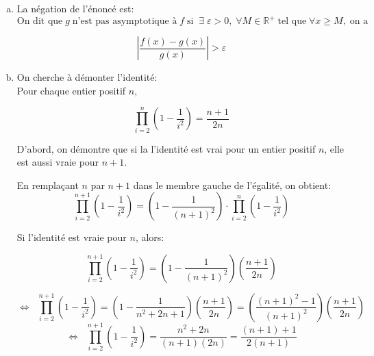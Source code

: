 \documentclass[letterpaper,12pt,oneside,final]{book}
\begin{document}
\begin{enumerate}[a)]

\item %
La négation de l'énoncé est:\\
\begin{equation*}
    \text{On dit que} \; g\; \text{n'est pas asymptotique à}\; f \; \text{si} \;
    \; \exists
    \; \varepsilon > 0, \;\forall M \in \mathbb{R}^{+} \; \text{tel que} \; \forall x \geq M, \;
    \text{on a}
\end{equation*}

\begin{equation*}
    \left \vert \frac{f(x)-g(x)}{g(x)} \right \vert > \varepsilon
\end{equation*}

\item %
On cherche à démonter l'identité:\\
Pour chaque entier positif $n$,

\begin{equation*}
\prod _{i=2}^{n} \left ( 1 - \frac{1}{i^2} \right ) = \frac{n+1}{2n}    
\end{equation*}

D'abord, on démontre que si la l'identité est vrai pour un entier positif $n$, elle est aussi vraie pour $n+1$.

En remplaçant $n$ par $n+1$ dans le membre gauche de l'égalité, on obtient:
\begin{equation*}
    \prod _{i=2}^{n+1} \left ( 1 - \frac{1}{i^2} \right ) = \left (1 - \frac{1}{(n+1)^2} \right )
\cdot \prod _{i=2}^{n} \left ( 1 - \frac{1}{i^2} \right ) 
\end{equation*}

Si l'identité est vraie pour $n$, alors:

\begin{equation*}
    \prod _{i=2}^{n+1} \left ( 1 - \frac{1}{i^2} \right ) = \left (1 - \frac{1}{(n+1)^2} \right ) \left (
    \frac{n+1}{2n} \right )
\end{equation*}

\begin{equation*}
   \Leftrightarrow \; \; \prod _{i=2}^{n+1} \left ( 1 - \frac{1}{i^2} \right ) = \left(1-\frac{1}{n^2+2n+1}\right)\left(\frac{n+1}{2n}\right) = 
    \left(\frac{(n+1)^2-1}{(n+1)^2}\right)\left(\frac{n+1}{2n}\right)
\end{equation*}
\begin{equation*}
    \Leftrightarrow \; \; \prod _{i=2}^{n+1} \left ( 1 - \frac{1}{i^2} \right ) = \frac{n^2+2n}{(n+1)(2n)} = \frac{(n+1)+1}{2(n+1)}
\end{equation*}
\end{enumerate}
\end{document}
